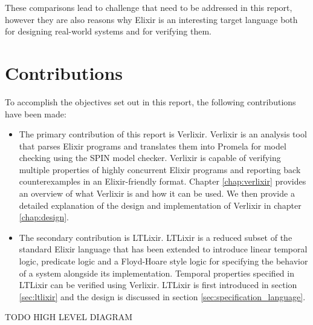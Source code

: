 These comparisons lead to challenge that need to be addressed in this report, however they are also reasons why Elixir is an interesting target language both for designing real-world systems and for verifying them.  
\section{Contributions}
To accomplish the objectives set out in this report, the following contributions have been made:
\begin{itemize}
    \item The primary contribution of this report is Verlixir. Verlixir is an analysis tool that parses Elixir programs and translates them into Promela \cite{promela} for model checking using the SPIN \cite{spin} model checker. Verlixir is capable of verifying multiple properties of highly concurrent Elixir programs and reporting back counterexamples in an Elixir-friendly format. Chapter \ref{chap:verlixir} provides an overview of what Verlixir is and how it can be used. We then provide a detailed explanation of the design and implementation of Verlixir in chapter \ref{chap:design}.
    \item The secondary contribution is LTLixir. LTLixir is a reduced subset of the standard Elixir language that has been extended to introduce linear temporal logic, predicate logic and a Floyd-Hoare style logic for specifying the behavior of a system alongside its implementation. Temporal properties specified in LTLixir can be verified using Verlixir. LTLixir is first introduced in section \ref{sec:ltlixir} and the design is discussed in section \ref{sec:specification_language}.
\end{itemize}
TODO HIGH LEVEL DIAGRAM
